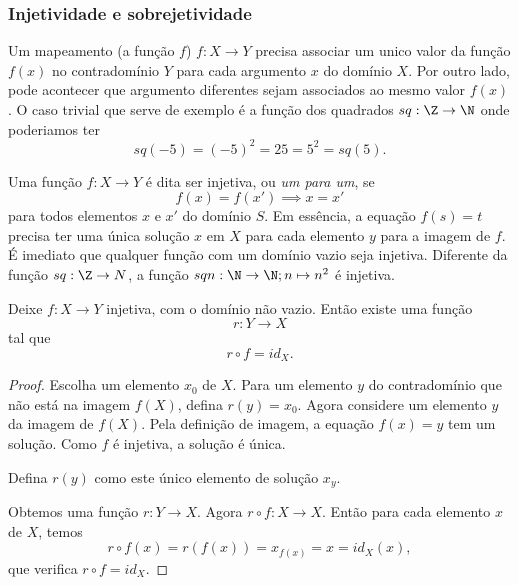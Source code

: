       \subsubsection{Injetividade e sobrejetividade}
         Um mapeamento (a função $f$) $f: X \to Y$ precisa associar um unico valor da função $f(x)$ no contradomínio $Y$ para cada argumento $x$ do domínio $X$. Por outro lado, pode acontecer que argumento diferentes sejam associados ao mesmo valor $f(x)$. O caso trivial que serve de exemplo é a função dos quadrados $sq: \Z \to \N$ onde poderiamos ter $$sq(-5) = (-5)^{2} = 25 = 5^{2} = sq(5).$$
         \begin{definition}
               Uma função $f: X \to Y$ é dita ser injetiva, ou \emph{um para um}, se $$f(x) = f(x') \implies x = x'$$
            para todos elementos $x$ e $x'$ do domínio $S$.
            Em essência, a equação $f(s) = t$ precisa ter uma única solução $x$ em $X$ para cada elemento $y$ para a imagem de $f$. É imediato que qualquer função com um domínio vazio seja injetiva. Diferente da função $sq: \Z \to N$, a função $sqn: \N \to \N; n \mapsto n^{2}$ é injetiva.
         \end{definition}
         \begin{stat}
            Deixe $f: X \to Y$ injetiva, com o domínio não vazio. Então existe uma função $$r: Y \to X$$
            tal que $$r \circ f = id_{X}.$$
            \begin{proof}
               Escolha um elemento $x_{0}$ de $X$. Para um elemento $y$ do contradomínio que
               não está na imagem $f(X)$, defina $r(y) = x_{0}$. Agora considere um elemento $y$ da imagem de $f(X)$. Pela definição de imagem, a equação $f(x) = y$ tem um solução. Como $f$ é injetiva, a solução é única. 
               
               Defina $r(y)$ como este único elemento de solução $x_{y}$. 
               
               Obtemos uma função $r: Y \to X$. Agora $r \circ f: X \to X$. Então para cada elemento $x$ de $X$, temos $$r\circ f(x) = r \left(f(x)\right) = x_{f(x)} = x = id_{X}(x),$$ que verifica $r \circ f = id_{X}.$
            \end{proof}
         \end{stat}
         
